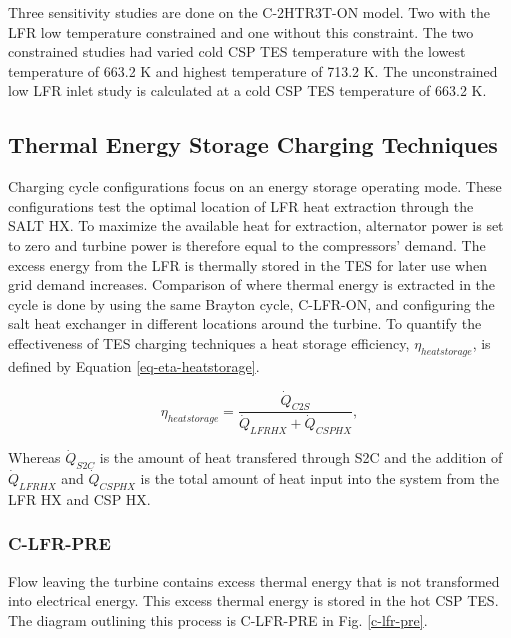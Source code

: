 \begin{paracol}{2}
\linenumbers
\switchcolumn

Three sensitivity studies are done on the C-2HTR3T-ON model. Two with the LFR low temperature constrained and one without this constraint. The two constrained studies had varied cold CSP TES temperature with the lowest temperature of 663.2 K and highest temperature of 713.2 K. The unconstrained low LFR inlet study is calculated at a cold CSP TES temperature of 663.2 K.  



\subsection{Thermal Energy Storage Charging Techniques} 

Charging cycle configurations focus on an energy storage operating mode. These configurations test the optimal location of LFR heat extraction through the SALT HX. To maximize the available heat for extraction, alternator power is set to zero and turbine power is therefore equal to the compressors' demand. The excess energy from the LFR is thermally stored in the TES for later use when grid demand increases. Comparison of where thermal energy is extracted in the cycle is done by using the same Brayton cycle, C-LFR-ON, and configuring the salt heat exchanger in different locations around the turbine. To quantify the effectiveness of TES charging techniques a heat storage efficiency, $\eta_{heatstorage}$, is defined by Equation \ref{eq-eta-heatstorage}.


\begin{equation}
    \label{eq-eta-heatstorage}
    \eta_{heatstorage} = \frac{\dot{Q}_{C2S}}{\dot{Q}_{LFRHX}+\dot{Q}_{CSPHX}},
\end{equation}

Whereas $\dot{Q}_{S2C}$ is the amount of heat transfered through S2C and the addition of $\dot{Q}_{LFRHX}$ and $\dot{Q}_{CSPHX}$ is the total amount of heat input into the system from the LFR HX and CSP HX.

\subsubsection{C-LFR-PRE} 

Flow leaving the turbine contains excess thermal energy that is not transformed into electrical energy. This excess thermal energy is stored in the hot CSP TES. The diagram outlining this process is C-LFR-PRE in Fig. \ref{c-lfr-pre}.  

\end{paracol}
